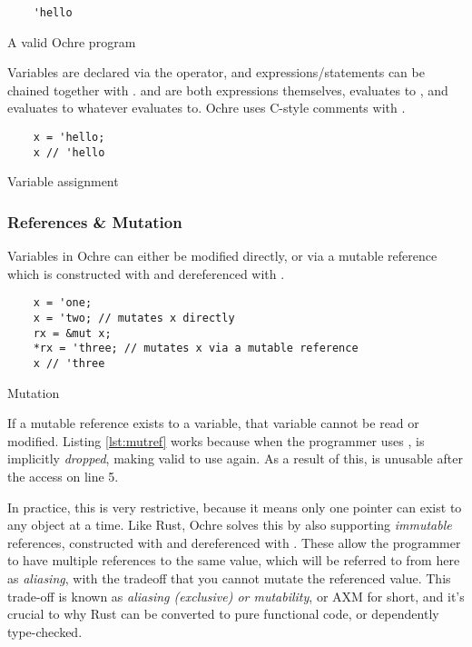 \documentclass[12pt,twoside]{report}
\begin{document}
\begin{listing}[H]
  \begin{verbatim}
    'hello
  \end{verbatim}
  \caption{A valid Ochre program}
\end{listing}

Variables are declared via the \mono{=} operator, and expressions/statements can be chained together with \mono{;}.  and  are both expressions themselves,  evaluates to , and  evaluates to whatever  evaluates to. Ochre uses C-style comments with \mono{//}.

\begin{listing}[H]
  \begin{verbatim}
    x = 'hello;
    x // 'hello
  \end{verbatim}
  \caption{Variable assignment}
\end{listing}

\subsubsection{References \& Mutation}

Variables in Ochre can either be modified directly, or via a mutable reference which is constructed with  and dereferenced with \mono{*}.

\begin{listing}[H]
  \begin{verbatim}
    x = 'one;
    x = 'two; // mutates x directly
    rx = &mut x;
    *rx = 'three; // mutates x via a mutable reference
    x // 'three
  \end{verbatim}
  \caption{Mutation}
  \label{lst:mutref}
\end{listing}

If a mutable reference exists to a variable, that variable cannot be read or modified. Listing \ref{lst:mutref} works because when the programmer uses ,  is implicitly \textit{dropped}, making  valid to use again. As a result of this,  is unusable after the  access on line 5.

In practice, this is very restrictive, because it means only one pointer can exist to any object at a time. Like Rust, Ochre solves this by also supporting \textit{immutable} references, constructed with \mono{\&} and dereferenced with \mono{*}. These allow the programmer to have multiple references to the same value, which will be referred to from here as \textit{aliasing}, with the tradeoff that you cannot mutate the referenced value. This trade-off is known as \textit{aliasing (exclusive) or mutability}, or AXM for short, and it's crucial to why Rust can be converted to pure functional code, or dependently type-checked.
\end{document}
